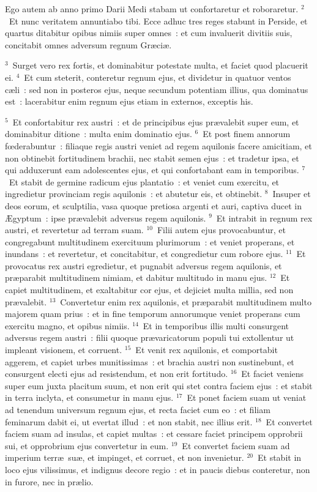 \bchapter
\lettrine[lines=3,image=true,loversize=0.05,lraise=-0.03]{E}{}go autem ab anno primo Darii Medi stabam ut confortaretur et roboraretur.
${}^{2}$~Et nunc veritatem annuntiabo tibi. Ecce adhuc tres reges stabunt in Perside, et quartus ditabitur opibus nimiis super omnes~: et cum invaluerit divitiis suis, concitabit omnes adversum regnum Gr\ae ci\ae .


${}^{3}$~Surget vero rex fortis, et dominabitur potestate multa, et faciet quod placuerit ei.
${}^{4}$~Et cum steterit, conteretur regnum ejus, et dividetur in quatuor ventos c\ae li~: sed non in posteros ejus, neque secundum potentiam illius, qua dominatus est~: lacerabitur enim regnum ejus etiam in externos, exceptis his.


${}^{5}$~Et confortabitur rex austri~: et de principibus ejus pr\ae valebit super eum, et dominabitur ditione~: multa enim dominatio ejus.
${}^{6}$~Et post finem annorum fœderabuntur~: filiaque regis austri veniet ad regem aquilonis facere amicitiam, et non obtinebit fortitudinem brachii, nec stabit semen ejus~: et tradetur ipsa, et qui adduxerunt eam adolescentes ejus, et qui confortabant eam in temporibus.
${}^{7}$~Et stabit de germine radicum ejus plantatio~: et veniet cum exercitu, et ingredietur provinciam regis aquilonis~: et abutetur eis, et obtinebit.
${}^{8}$~Insuper et deos eorum, et sculptilia, vasa quoque pretiosa argenti et auri, captiva ducet in \AE gyptum~: ipse pr\ae valebit adversus regem aquilonis.
${}^{9}$~Et intrabit in regnum rex austri, et revertetur ad terram suam.
${}^{10}$~Filii autem ejus provocabuntur, et congregabunt multitudinem exercituum plurimorum~: et veniet properans, et inundans~: et revertetur, et concitabitur, et congredietur cum robore ejus.
${}^{11}$~Et provocatus rex austri egredietur, et pugnabit adversus regem aquilonis, et pr\ae parabit multitudinem nimiam, et dabitur multitudo in manu ejus.
${}^{12}$~Et capiet multitudinem, et exaltabitur cor ejus, et dejiciet multa millia, sed non pr\ae valebit.
${}^{13}$~Convertetur enim rex aquilonis, et pr\ae parabit multitudinem multo majorem quam prius~: et in fine temporum annorumque veniet properans cum exercitu magno, et opibus nimiis.
${}^{14}$~Et in temporibus illis multi consurgent adversus regem austri~: filii quoque pr\ae varicatorum populi tui extollentur ut impleant visionem, et corruent.
${}^{15}$~Et venit rex aquilonis, et comportabit aggerem, et capiet urbes munitissimas~: et brachia austri non sustinebunt, et consurgent electi ejus ad resistendum, et non erit fortitudo.
${}^{16}$~Et faciet veniens super eum juxta placitum suum, et non erit qui stet contra faciem ejus~: et stabit in terra inclyta, et consumetur in manu ejus.
${}^{17}$~Et ponet faciem suam ut veniat ad tenendum universum regnum ejus, et recta faciet cum eo~: et filiam feminarum dabit ei, ut evertat illud~: et non stabit, nec illius erit.
${}^{18}$~Et convertet faciem suam ad insulas, et capiet multas~: et cessare faciet principem opprobrii sui, et opprobrium ejus convertetur in eum.
${}^{19}$~Et convertet faciem suam ad imperium terr\ae\ su\ae , et impinget, et corruet, et non invenietur.
${}^{20}$~Et stabit in loco ejus vilissimus, et indignus decore regio~: et in paucis diebus conteretur, non in furore, nec in pr\ae lio.


